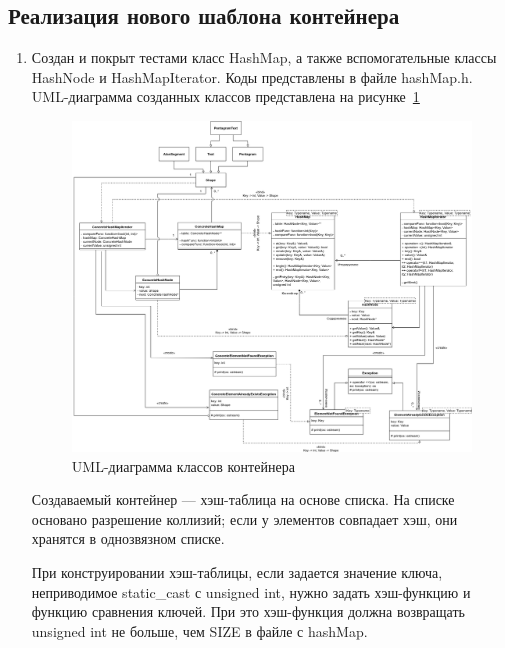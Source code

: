 \documentclass[a4paper, 14pt]{extarticle}
\begin{document}
\subsection{Реализация нового шаблона контейнера}
\begin{enumerate}
    \item Создан и покрыт тестами класс HashMap, а также вспомогательные классы HashNode и HashMapIterator. Коды представлены в файле hashMap.h.
    UML-диаграмма созданных классов представлена на рисунке~\ref{img:uml:container}
    \begin{figure}[h]
        \centering
        \includegraphics[width=0.83\textheight,angle=90]{./img/container_classes_uml.png}
        \caption{UML-диаграмма классов контейнера}%
        \label{img:uml:container}
    \end{figure}
    
    Создаваемый контейнер --- хэш-таблица на основе списка. На списке основано разрешение коллизий; если у элементов совпадает хэш, они хранятся в однозвязном списке.

    При конструировании хэш-таблицы, если задается значение ключа, неприводимое static\_cast с unsigned int, нужно задать хэш-функцию и функцию сравнения ключей. При это хэш-функция должна возвращать unsigned int не больше, чем SIZE в файле с hashMap.


\end{enumerate}
\end{document}
